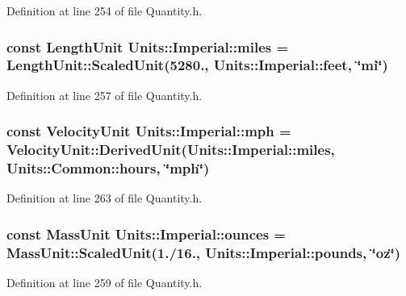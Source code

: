 Definition at line 254 of file Quantity.\+h.

\hypertarget{class_units_1_1_imperial_a3ccc983d656c0b984f7b269d6e6c3625}{
\subsubsection[{miles}]{\setlength{\rightskip}{0pt plus 5cm}const {\bf Length\+Unit} Units\+::\+Imperial\+::miles = {\bf Length\+Unit\+::\+Scaled\+Unit}(5280., {\bf Units\+::\+Imperial\+::feet}, \char`\"{}mi\char`\"{})\hspace{0.3cm}{\ttfamily [static]}}}\label{class_units_1_1_imperial_a3ccc983d656c0b984f7b269d6e6c3625}


Definition at line 257 of file Quantity.\+h.

\hypertarget{class_units_1_1_imperial_aa16979886192a537b02c2421701c8e25}{
\subsubsection[{mph}]{\setlength{\rightskip}{0pt plus 5cm}const {\bf Velocity\+Unit} Units\+::\+Imperial\+::mph = {\bf Velocity\+Unit\+::\+Derived\+Unit}({\bf Units\+::\+Imperial\+::miles}, {\bf Units\+::\+Common\+::hours}, \char`\"{}mph\char`\"{})\hspace{0.3cm}{\ttfamily [static]}}}\label{class_units_1_1_imperial_aa16979886192a537b02c2421701c8e25}


Definition at line 263 of file Quantity.\+h.

\hypertarget{class_units_1_1_imperial_af866267c1b81518be69261c840d1e201}{
\subsubsection[{ounces}]{\setlength{\rightskip}{0pt plus 5cm}const {\bf Mass\+Unit} Units\+::\+Imperial\+::ounces = {\bf Mass\+Unit\+::\+Scaled\+Unit}(1./16., {\bf Units\+::\+Imperial\+::pounds}, \char`\"{}oz\char`\"{})\hspace{0.3cm}{\ttfamily [static]}}}\label{class_units_1_1_imperial_af866267c1b81518be69261c840d1e201}


Definition at line 259 of file Quantity.\+h.

